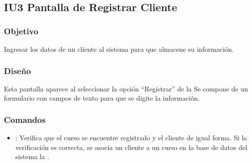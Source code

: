 \subsection{IU3 Pantalla de Registrar Cliente}

\subsubsection{Objetivo}
	Ingresar los datos de un cliente al sistema para que almacene su información.

\subsubsection{Diseño}
Esta pantalla aparece al seleccionar la opción ``Registrar'' de la  Se compone de un formulario con campos de texto para que se digite la información.


\subsubsection{Comandos}
\begin{itemize}
	\item {}: Verifica que el curso se encuentre registrado y el cliente de igual forma. Si la verificación es correcta, se asocia un cliente a un curso en la base de datos del sistema la .
\end{itemize}


